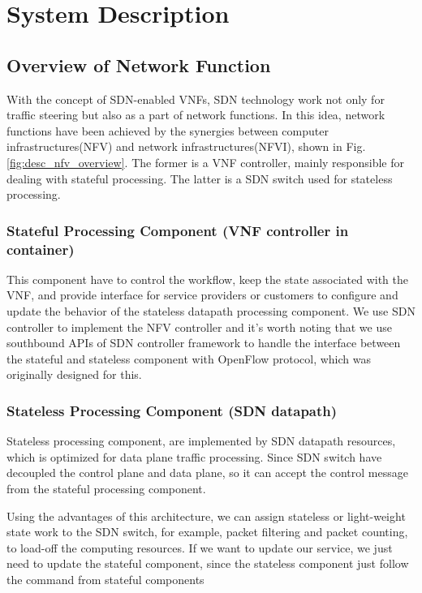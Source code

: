 \documentclass[journal]{IEEEtran}
\begin{document}
\section{System Description}
\subsection{Overview of Network Function}\label{ssec:desc_nfv_overview}
With the concept of SDN-enabled VNFs\cite{sdn-enabled}\cite{manage-nve}, SDN technology work not only for traffic steering but also as a part of network functions. In this idea, network functions have been achieved by the synergies between computer infrastructures(NFV) and network infrastructures(NFVI)\cite{nfv2014-v121}\cite{nfv2014-v111}\cite{nfv2015}, shown in Fig. \ref{fig:desc_nfv_overview}. The former is a VNF controller, mainly responsible for dealing with stateful processing. The latter is a SDN switch used for stateless processing.

\subsubsection{Stateful Processing Component (VNF controller in container)}
This component have to control the workflow, keep the state associated with the VNF, and provide interface for service providers or customers to configure and update the behavior of the stateless datapath processing component. We use SDN controller to implement the NFV controller and it’s worth noting that we use southbound APIs of SDN controller framework to handle the interface between the stateful and stateless component with OpenFlow protocol, which was originally designed for this.

\subsubsection{Stateless Processing Component (SDN datapath)}
Stateless processing component, are implemented by SDN datapath resources, which is optimized for data plane traffic processing. Since SDN switch have decoupled the control plane and data plane, so it can accept the control message from the stateful processing component.

Using the advantages of this architecture, we can assign stateless or light-weight state work to the SDN switch, for example, packet filtering and packet counting, to load-off the computing resources. If we want to update our service, we just need to update the stateful component, since the stateless component just follow the command from stateful components
\end{document}
